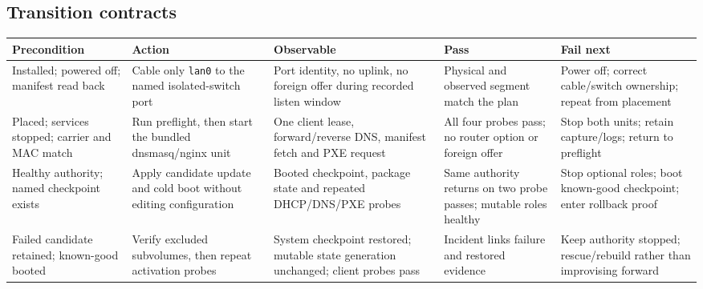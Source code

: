 \subsection*{Transition contracts}
{\footnotesize
\begin{tabularx}{\linewidth}{@{}p{.16\linewidth}p{.17\linewidth}p{.20\linewidth}p{.20\linewidth}L@{}}
\toprule
\textbf{Precondition} & \textbf{Action} & \textbf{Observable} & \textbf{Pass} & \textbf{Fail next}\\
\midrule
Installed; powered off; manifest read back & Cable only \texttt{lan0} to the named isolated-switch port & Port identity, no uplink, no foreign offer during recorded listen window & Physical and observed segment match the plan & Power off; correct cable/switch ownership; repeat from placement\\
Placed; services stopped; carrier and MAC match & Run preflight, then start the bundled dnsmasq/nginx unit & One client lease, forward/reverse DNS, manifest fetch and PXE request & All four probes pass; no router option or foreign offer & Stop both units; retain capture/logs; return to preflight\\
Healthy authority; named checkpoint exists & Apply candidate update and cold boot without editing configuration & Booted checkpoint, package state and repeated DHCP/DNS/PXE probes & Same authority returns on two probe passes; mutable roles healthy & Stop optional roles; boot known-good checkpoint; enter rollback proof\\
Failed candidate retained; known-good booted & Verify excluded subvolumes, then repeat activation probes & System checkpoint restored; mutable state generation unchanged; client probes pass & Incident links failure and restored evidence & Keep authority stopped; rescue/rebuild rather than improvising forward\\
\bottomrule
\end{tabularx}}

